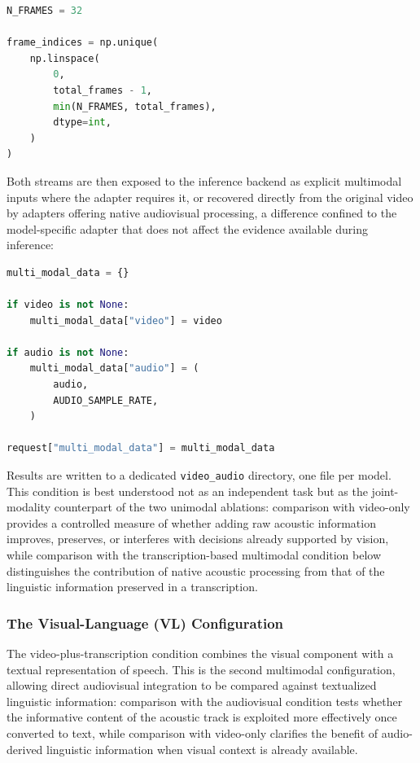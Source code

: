 \begin{lstlisting}[language=Python]
N_FRAMES = 32

frame_indices = np.unique(
    np.linspace(
        0,
        total_frames - 1,
        min(N_FRAMES, total_frames),
        dtype=int,
    )
)
\end{lstlisting}
Both streams are then exposed to the inference backend as explicit multimodal inputs where the adapter requires it, or recovered directly from the original video by adapters offering native audiovisual processing, a difference confined to the model-specific adapter that does not affect the evidence available during inference:
\begin{lstlisting}[language=Python]
multi_modal_data = {}

if video is not None:
    multi_modal_data["video"] = video

if audio is not None:
    multi_modal_data["audio"] = (
        audio,
        AUDIO_SAMPLE_RATE,
    )

request["multi_modal_data"] = multi_modal_data
\end{lstlisting}
Results are written to a dedicated \texttt{video\_audio} directory, one file per model. This condition is best understood not as an independent task but as the joint-modality counterpart of the two unimodal ablations: comparison with video-only provides a controlled measure of whether adding raw acoustic information improves, preserves, or interferes with decisions already supported by vision, while comparison with the transcription-based multimodal condition below distinguishes the contribution of native acoustic processing from that of the linguistic information preserved in a transcription.
\subsubsection*{The Visual-Language (VL) Configuration}
The video-plus-transcription condition combines the visual component with a textual representation of speech. This is the second multimodal configuration, allowing direct audiovisual integration to be compared against textualized linguistic information: comparison with the audiovisual condition tests whether the informative content of the acoustic track is exploited more effectively once converted to text, while comparison with video-only clarifies the benefit of audio-derived linguistic information when visual context is already available.
